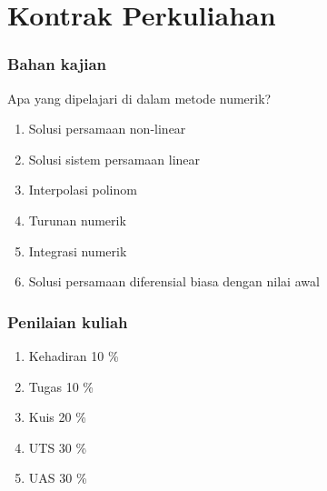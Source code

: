 \documentclass[pdflatex,compress]{beamer}
\begin{document}
\section{Kontrak Perkuliahan}

\begin{frame}
	\frametitle{Bahan kajian}
	Apa yang dipelajari di dalam metode numerik?
	\begin{enumerate}
		\item Solusi persamaan non-linear
		\item Solusi sistem persamaan linear
		\item Interpolasi polinom
		\item Turunan numerik
		\item Integrasi numerik
		\item Solusi persamaan diferensial biasa dengan nilai awal
	\end{enumerate}
\end{frame}

\begin{frame}
	\frametitle{Penilaian kuliah}
	\begin{enumerate}
		\item Kehadiran 10 \%
		\item Tugas 10 \%
		\item Kuis 20 \%
		\item UTS 30 \%
		\item UAS 30 \%
	\end{enumerate}
\end{frame}
\end{document}

